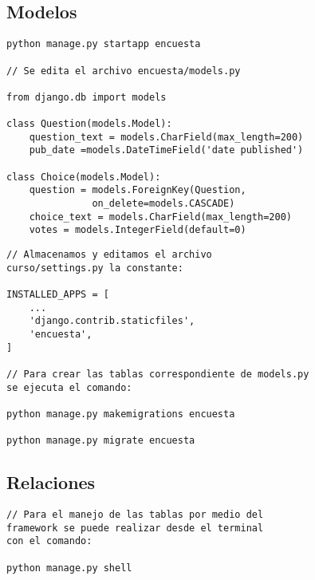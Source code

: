 \documentclass[xcolor=dvipsnames]{beamer}
\begin{document}
\subsection{Modelos}
\begin{frame}[fragile]
\begin{verbatim}
python manage.py startapp encuesta

// Se edita el archivo encuesta/models.py

from django.db import models

class Question(models.Model):
    question_text = models.CharField(max_length=200)
    pub_date =models.DateTimeField('date published')

class Choice(models.Model):
    question = models.ForeignKey(Question, 
               on_delete=models.CASCADE)
    choice_text = models.CharField(max_length=200)
    votes = models.IntegerField(default=0)

\end{verbatim}
\end{frame}

\begin{frame}[fragile]
\begin{verbatim}
// Almacenamos y editamos el archivo 
curso/settings.py la constante:

INSTALLED_APPS = [
    ...
    'django.contrib.staticfiles',
    'encuesta',
]

// Para crear las tablas correspondiente de models.py
se ejecuta el comando:

python manage.py makemigrations encuesta

python manage.py migrate encuesta

\end{verbatim}
\end{frame}

\subsection{Relaciones}
\begin{frame}[fragile]
\begin{verbatim}
// Para el manejo de las tablas por medio del 
framework se puede realizar desde el terminal 
con el comando:

python manage.py shell


\end{verbatim}
\end{frame}
\end{document}
